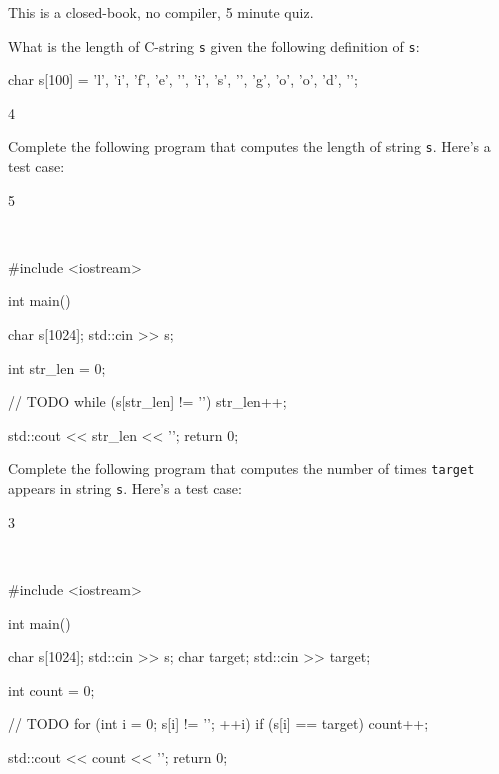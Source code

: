 

This is a closed-book, no compiler, 5 minute quiz.

\nextq
What is the length of C-string \verb!s! given the following definition of
\verb!s!:
\begin{console}[fontsize=\footnotesize]
char s[100] = {'l', 'i', 'f', 'e', '\0', 'i', 's', '\0', 'g', 'o', 'o', 'd', '\0'};
\end{console}
\ANSWER
\begin{answercode}
4
\end{answercode}

\nextq
Complete the following program that computes the length of string \verb!s!.
Here's a test case:
\begin{console}[fontsize=\footnotesize,commandchars=\\\{\}]
5
\end{console}
\\
\ANSWER
\begin{answercode}
#include <iostream>

int main()
{
    char s[1024];
    std::cin >> s;

    int str_len = 0;

    // TODO
    while (s[str_len] != '\0') 
    {
        str_len++;
    }

    std::cout << str_len << '\n';
    return 0;
}
\end{answercode}

\nextq
Complete the following program that computes the number of times
\verb!target! appears in string \verb!s!.
Here's a test case:
\begin{console}[fontsize=\footnotesize,commandchars=\\\{\}]
3
\end{console}
\\
\ANSWER
\begin{answercode}
#include <iostream>

int main()
{
    char s[1024];
    std::cin >> s; 
    char target;
    std::cin >> target; 

    int count = 0;

    // TODO
    for (int i = 0; s[i] != '\0'; ++i)
    {
        if (s[i] == target)
        {
            count++;
        }
    }

    std::cout << count << '\n';
    return 0;
}

\end{answercode}



